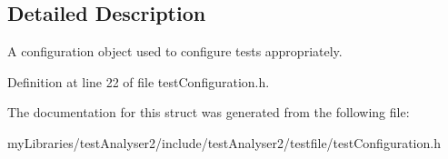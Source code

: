 \subsection{Detailed Description}
A configuration object used to configure tests appropriately. 

Definition at line 22 of file test\+Configuration.\+h.



The documentation for this struct was generated from the following file\+:\begin{DoxyCompactItemize}
\item 
my\+Libraries/test\+Analyser2/include/test\+Analyser2/testfile/test\+Configuration.\+h\end{DoxyCompactItemize}
